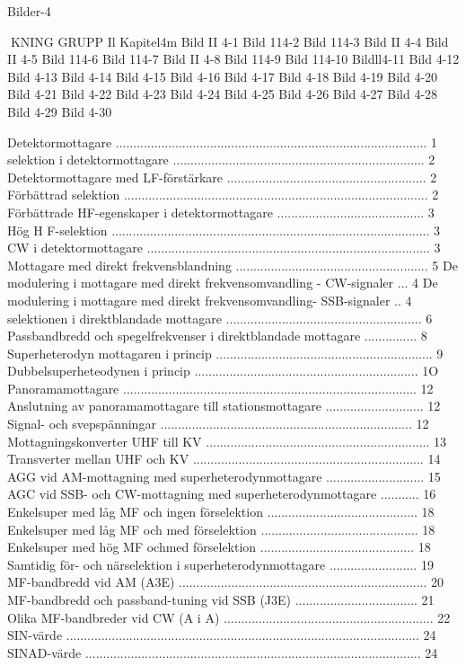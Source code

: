 \documentclass[a4paper,twoside,twocolumn,openright]{book}
\begin{document}
{{{{{{{{{{{Bilder-4

KNING
GRUPP Il
Kapitel4m
Bild II 4-1
Bild 114-2
Bild 114-3
Bild II 4-4
Bild II 4-5
Bild 114-6
Bild 114-7
Bild II 4-8
Bild 114-9
Bild 114-10
Bildll4-11
Bild 4-12
Bild 4-13
Bild 4-14
Bild 4-15
Bild 4-16
Bild 4-17
Bild 4-18
Bild 4-19
Bild 4-20
Bild 4-21
Bild 4-22
Bild 4-23
Bild 4-24
Bild 4-25
Bild 4-26
Bild 4-27
Bild 4-28
Bild 4-29
Bild 4-30

Detektormottagare ......................................................................................... 1
selektion i detektormottagare ........................................................................ 2
Detektormottagare med LF-förstärkare ......................................................... 2
Förbättrad selektion ....................................................................................... 2
Förbättrade HF-egenskaper i detektormottagare .......................................... 3
Hög H F-selektion ........................................................................................... 3
CW i detektormottagare ................................................................................. 3
Mottagare med direkt frekvensblandning ....................................................... 5
De modulering i mottagare med direkt frekvensomvandling - CW-signaler ... 4
De modulering i mottagare med direkt frekvensomvandling- SSB-signaler .. 4
selektionen i direktblandade mottagare ........................................................ 6
Passbandbredd och spegelfrekvenser i direktblandade mottagare ............... 8
Superheterodyn mottagaren i princip .............................................................. 9
Dubbelsuperheteodynen i princip ................................................................ 1O
Panoramamottagare .................................................................................... 12
Anslutning av panoramamottagare till stationsmottagare ............................ 12
Signal- och svepspänningar ........................................................................ 12
Mottagningskonverter UHF till KV ................................................................ 13
Transverter mellan UHF och KV .................................................................. 14
AGG vid AM-mottagning med superheterodynmottagare ............................ 15
AGC vid SSB- och CW-mottagning med superheterodynmottagare ........... 16
Enkelsuper med låg MF och ingen förselektion ........................................... 18
Enkelsuper med låg MF och med förselektion ............................................. 18
Enkelsuper med hög MF ochmed förselektion ............................................ 18
Samtidig för- och närselektion i superheterodynmottagare ......................... 19
MF-bandbredd vid AM (A3E) ....................................................................... 20
MF-bandbredd och passband-tuning vid SSB (J3E) ................................... 21
Olika MF-bandbreder vid CW (A i A) ............................................................ 22
SIN-värde ..................................................................................................... 24
SINAD-värde ................................................................................................ 24

}}}}}}}}}}}
\end{document}
